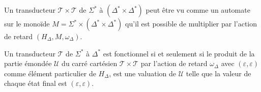 	Un transducteur $\mathscr{T} \times \mathscr{T}$ de $\Sigma^*$ à $(\Delta^* \times \Delta^*)$ peut être vu comme un automate sur le monoïde $M = \Sigma^* \times (\Delta^* \times \Delta^*)$ qu'il est possible de multiplier par l'action de retard $(H_\Delta, M, \omega_\Delta)$. \\
	
	\begin{theorem}
		Un transducteur $\mathscr{T}$ de $\Sigma^*$ à $\Delta^*$ est fonctionnel si et seulement si le produit de la partie émondée $\mathscr{U}$ du carré cartésien $\mathscr{T} \times \mathscr{T}$ par l'action de retard $\omega_\Delta$ avec $(\varepsilon, \varepsilon)$ comme élément particulier de $H_\Delta$, est une valuation de $\mathscr{U}$ telle que la valeur de chaque état final est $(\varepsilon, \varepsilon)$.
		\label{VAL}
	\end{theorem}
